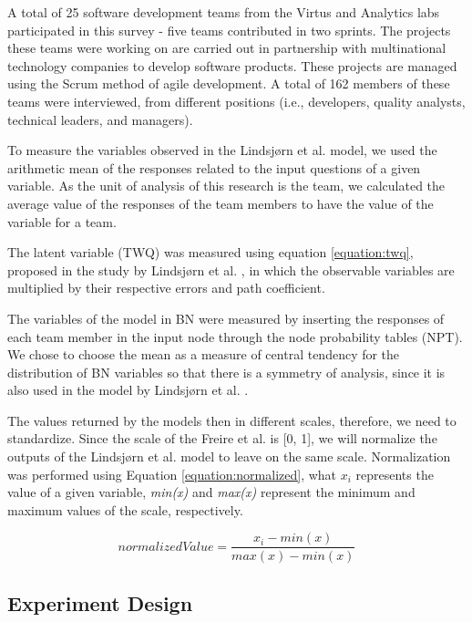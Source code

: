 A total of 25 software development teams from the Virtus and Analytics labs participated in this survey - five teams contributed in two sprints. The projects these teams were working on are carried out in partnership with multinational technology companies to develop software products. These projects are managed using the Scrum method of agile development. A total of 162 members of these teams were interviewed, from different positions (i.e., developers, quality analysts, technical leaders, and managers).

To measure the variables observed in the Lindsjørn et al. \cite{lindsjorn2016teamwork} model, we used the arithmetic mean of the responses related to the input questions of a given variable. As the unit of analysis of this research is the team, we calculated the average value of the responses of the team members to have the value of the variable for a team.

The latent variable (TWQ) was measured using equation \ref{equation:twq}, proposed in the study by Lindsjørn et al. \cite{lindsjorn2016teamwork}, in which the observable variables are multiplied by their respective errors and path coefficient.

The variables of the model in BN were measured by inserting the responses of each team member in the input node through the node probability tables (NPT). We chose to choose the mean as a measure of central tendency for the distribution of BN variables so that there is a symmetry of analysis, since it is also used in the model by Lindsjørn et al. \cite{lindsjorn2016teamwork}.

The values returned by the models then in different scales, therefore, we need to standardize. Since the scale of the Freire et al. \cite{freire2018bayesian} is [0, 1], we will normalize the outputs of the Lindsjørn et al. \cite{lindsjorn2016teamwork} model to leave on the same scale. Normalization was performed using Equation \ref{equation:normalized}, what ${x_i}$ represents the value of a given variable, \textit{min(x)} and \textit{max(x)} represent the minimum and maximum values of the scale, respectively.

\begin{equation}
  normalized Value = \frac{x_i - min(x)}{max(x) - min(x)} 
\label{equation:normalized}
\end{equation}

\subsection{Experiment Design}
\label{experiment_design}


